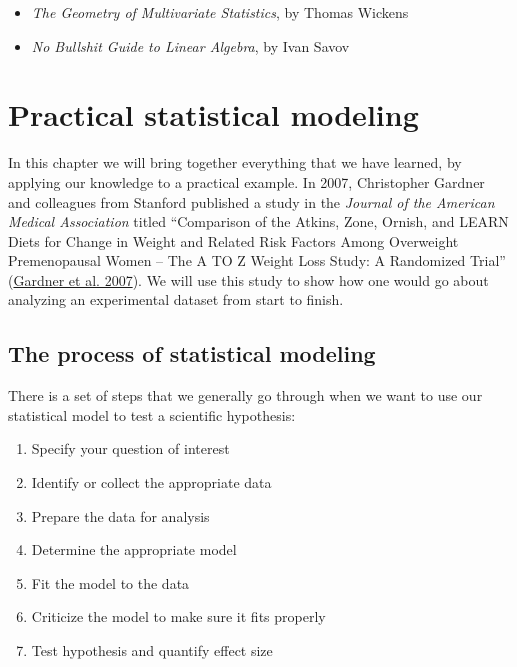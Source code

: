 \documentclass[
  12pt,
]{book}
\providecommand{\tightlist}{%
  \setlength{\itemsep}{0pt}\setlength{\parskip}{0pt}}
\begin{document}
\begin{itemize}
\tightlist
\item
  \emph{The Geometry of Multivariate Statistics}, by Thomas Wickens
\item
  \emph{No Bullshit Guide to Linear Algebra}, by Ivan Savov
\end{itemize}

\hypertarget{practical-example}{%
\chapter{Practical statistical modeling}\label{practical-example}}

In this chapter we will bring together everything that we have learned, by applying our knowledge to a practical example. In 2007, Christopher Gardner and colleagues from Stanford published a study in the \emph{Journal of the American Medical Association} titled ``Comparison of the Atkins, Zone, Ornish, and LEARN Diets for Change in Weight and Related Risk Factors Among Overweight Premenopausal Women -- The A TO Z Weight Loss Study: A Randomized Trial'' (\protect\hyperlink{ref-gard:kiaz:alha:2007}{Gardner et al. 2007}). We will use this study to show how one would go about analyzing an experimental dataset from start to finish.

\hypertarget{the-process-of-statistical-modeling}{%
\section{The process of statistical modeling}\label{the-process-of-statistical-modeling}}

There is a set of steps that we generally go through when we want to use our statistical model to test a scientific hypothesis:

\begin{enumerate}
\def\labelenumi{\arabic{enumi}.}
\tightlist
\item
  Specify your question of interest
\item
  Identify or collect the appropriate data
\item
  Prepare the data for analysis
\item
  Determine the appropriate model
\item
  Fit the model to the data
\item
  Criticize the model to make sure it fits properly
\item
  Test hypothesis and quantify effect size
\end{enumerate}
\end{document}
